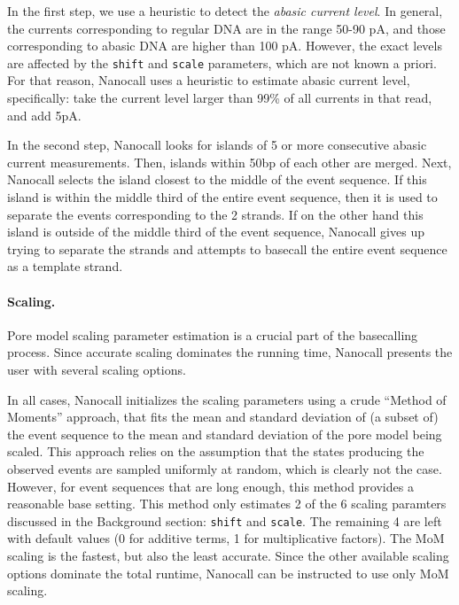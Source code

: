 \documentclass{bioinfo}
\begin{document}
\begin{methods}
In the first step, we use a heuristic to detect the \emph{abasic current level}. In general, the currents corresponding to regular DNA are in the range 50-90 pA, and those corresponding to abasic DNA are higher than 100 pA. However, the exact levels are affected by the \texttt{shift} and \texttt{scale} parameters, which are not known a priori. For that reason, Nanocall uses a heuristic to estimate abasic current level, specifically: take the current level larger than 99\% of all currents in that read, and add 5pA.

In the second step, Nanocall looks for islands of 5 or more consecutive abasic current measurements. Then, islands within 50bp of each other are merged. Next, Nanocall selects the island closest to the middle of the event sequence. If this island is within the middle third of the entire event sequence, then it is used to separate the events corresponding to the 2 strands. If on the other hand this island is outside of the middle third of the event sequence, Nanocall gives up trying to separate the strands and attempts to basecall the entire event sequence as a template strand.

\paragraph{Scaling.}
Pore model scaling parameter estimation is a crucial part of the basecalling process. Since accurate scaling dominates the running time, Nanocall presents the user with several scaling options.

In all cases, Nanocall initializes the scaling parameters using a crude ``Method of Moments'' approach, that fits the mean and standard deviation of (a subset of) the event sequence to the mean and standard deviation of the pore model being scaled. This approach relies on the assumption that the states producing the observed events are sampled uniformly at random, which is clearly not the case. However, for event sequences that are long enough, this method provides a reasonable base setting. This method only estimates 2 of the 6 scaling paramters discussed in the Background section: \texttt{shift} and \texttt{scale}. The remaining 4 are left with default values (0 for additive terms, 1 for multiplicative factors). The MoM scaling is the fastest, but also the least accurate. Since the other available scaling options dominate the total runtime, Nanocall can be instructed to use only MoM scaling.


\end{methods}
\end{document}
